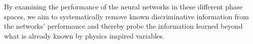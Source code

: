 By examining the performance of the neural networks in these different phase spaces, we aim to systematically remove known discriminative information from the networks' performance and thereby probe the information learned beyond what is already known by physics inspired variables.


